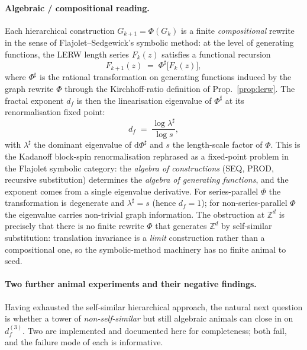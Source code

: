 \documentclass[10pt,a4paper,twocolumn]{article}
\theoremstyle{plain}
\theoremstyle{definition}
\begin{document}
\paragraph{Algebraic / compositional reading.}
Each hierarchical construction $G_{k+1} = \Phi(G_k)$ is a finite
\emph{compositional} rewrite in the sense of Flajolet--Sedgewick's
symbolic method: at the level of generating functions, the LERW
length series $F_k(z)$ satisfies a functional recursion
\begin{equation}
  F_{k+1}(z) \;=\; \Phi^\sharp \bigl[ F_k(z) \bigr],
  \label{eq:rg-recursion}
\end{equation}
where $\Phi^\sharp$ is the rational transformation on
generating functions induced by the graph rewrite $\Phi$ through
the Kirchhoff-ratio definition of Prop.~\ref{prop:lerw}.  The
fractal exponent $d_f$ is then the linearisation eigenvalue of
$\Phi^\sharp$ at its renormalisation fixed point:
\[
  d_f \;=\; \frac{\log \lambda^\sharp}{\log s},
\]
with $\lambda^\sharp$ the dominant eigenvalue of
$\mathrm{d}\Phi^\sharp$ and $s$ the length-scale factor of
$\Phi$.  This is the Kadanoff block-spin renormalisation rephrased
as a fixed-point problem in the Flajolet symbolic category: the
\emph{algebra of constructions} (SEQ, PROD, recursive
substitution) determines the \emph{algebra of generating
functions}, and the exponent comes from a single eigenvalue
derivative.  For series-parallel $\Phi$ the transformation is
degenerate and $\lambda^\sharp = s$ (hence $d_f = 1$); for
non-series-parallel $\Phi$ the eigenvalue carries non-trivial
graph information.  The obstruction at $\mathbb{Z}^d$ is precisely
that there is no finite rewrite $\Phi$ that generates $\mathbb{Z}^d$
by self-similar substitution: translation invariance is a
\emph{limit} construction rather than a compositional one, so the
symbolic-method machinery has no finite animal to seed.

\paragraph{Two further animal experiments and their negative
findings.}
Having exhausted the self-similar hierarchical approach, the
natural next question is whether a tower of
\emph{non-self-similar} but still algebraic animals can close in
on $d_f^{(3)}$.  Two are implemented and documented here for
completeness; both fail, and the failure mode of each is
informative.
\end{document}
